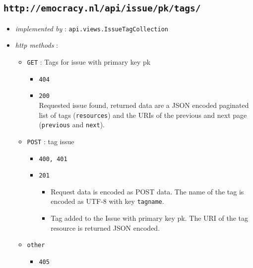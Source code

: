 \documentclass[a4paper]{report}
\begin{document}
\subsection{\texttt{http://emocracy.nl/api/issue/\textsf{pk}/tags/}}
\begin{itemize}
    \item{\textsl{implemented by} : \texttt{api.views.IssueTagCollection}}
    \item{\textsl{http methods} :
        \begin{itemize}
            \item{\texttt{GET} : Tags for issue with primary key \textsf{pk}
                \begin{itemize}
                    \item{\texttt{404}}
                    \item{\texttt{200}\\
                    Requested issue found, returned data are a JSON encoded
                    paginated list of tags (\texttt{resources}) and the URIs of 
                    the previous and next page (\texttt{previous} and \texttt{next}).
                    }
                \end{itemize}
            }
            \item{\texttt{POST} : tag issue 
                \begin{itemize}
                    \item{\texttt{400, 401}}
                    \item{\texttt{201}\\
                    \begin{itemize}
                    \item{Request data is encoded as POST data. The name of the 
                    tag is encoded as UTF-8 with key \texttt{tagname}.}
                    \item{Tag added to the Issue with primary key \textsf{pk}. The 
                    URI of the tag resource is returned JSON encoded.}
                    \end{itemize}
                    }
                \end{itemize}
            }
            \item{\texttt{other}
                \begin{itemize}
                    \item{\texttt{405}}
                \end{itemize}
            }
        \end{itemize}
    }
\end{itemize}
\end{document}
